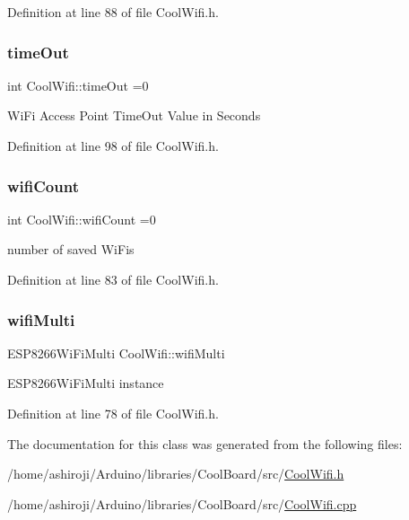 Definition at line 88 of file Cool\+Wifi.\+h.

\mbox{\label{class_cool_wifi_a952111605f25156588b5632caaba1c6f}} 
\subsubsection{\texorpdfstring{time\+Out}{timeOut}}
{\footnotesize\ttfamily int Cool\+Wifi\+::time\+Out =0\hspace{0.3cm}{\ttfamily [private]}}

Wi\+Fi Access Point Time\+Out Value in Seconds 

Definition at line 98 of file Cool\+Wifi.\+h.

\mbox{\label{class_cool_wifi_ab133bd92fcb895b884deecd6678592e4}} 
\subsubsection{\texorpdfstring{wifi\+Count}{wifiCount}}
{\footnotesize\ttfamily int Cool\+Wifi\+::wifi\+Count =0\hspace{0.3cm}{\ttfamily [private]}}

number of saved Wi\+Fi\textquotesingle{}s 

Definition at line 83 of file Cool\+Wifi.\+h.

\mbox{\label{class_cool_wifi_a7862a8c0d7239877e2956c14a368aab8}} 
\subsubsection{\texorpdfstring{wifi\+Multi}{wifiMulti}}
{\footnotesize\ttfamily E\+S\+P8266\+Wi\+Fi\+Multi Cool\+Wifi\+::wifi\+Multi\hspace{0.3cm}{\ttfamily [private]}}

E\+S\+P8266\+Wi\+Fi\+Multi instance 

Definition at line 78 of file Cool\+Wifi.\+h.



The documentation for this class was generated from the following files\+:\begin{DoxyCompactItemize}
\item 
/home/ashiroji/\+Arduino/libraries/\+Cool\+Board/src/\hyperlink{_cool_wifi_8h}{Cool\+Wifi.\+h}\item 
/home/ashiroji/\+Arduino/libraries/\+Cool\+Board/src/\hyperlink{_cool_wifi_8cpp}{Cool\+Wifi.\+cpp}\end{DoxyCompactItemize}
